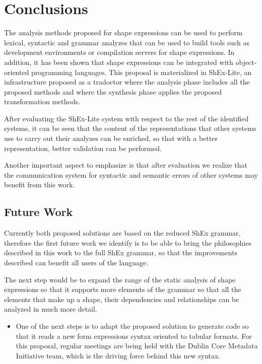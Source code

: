 \chapter{Conclusions}
\label{ch:conclusions}
The analysis methods proposed for shape expressions can be used to perform lexical,
syntactic and grammar analyzes that can be used to build tools such as development
environments or compilation servers for shape expressions. In addition, it has been
shown that shape expressions can be integrated with object-oriented programming
languages. This proposal is materialized in ShEx-Lite, an infrastructure proposed
as a tradoctor where the analysis phase includes all the proposed methods and where
the synthesis phase applies the proposed transformation methods.

After evaluating the ShEx-Lite system with respect to the rest of the identified systems,
it can be seen that the content of the representations that other systems use to carry
out their analyzes can be enriched, so that with a better representation, better
validation can be performed.

Another important aspect to emphasize is that after evaluation we realize that the
communication system for syntactic and semantic errors of other systems may benefit
from this work.


\section{Future Work}
Currently both proposed solutions are based on the reduced ShEx grammar,
therefore the first future work we identify is to be able to bring the philosophies
described in this work to the full ShEx grammar, so that the improvements described
can benefit all users of the language.

The next step would be to expand the range of the static analysis of shape expressions
so that it supports more elements of the grammar so that all the elements that make
up a shape, their dependencies and relationships can be analyzed in much more detail.

\begin{itemize}
    \item One of the next steps is to adapt the proposed solution to generate code so
    that it reads a new form expressions syntax oriented to tabular formats. For this
    proposal, regular meetings are being held with the Dublin Core Metadata Initiative
    team, which is the driving force behind this new syntax.

\end{itemize}